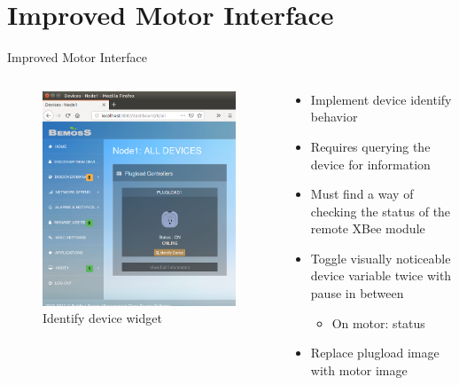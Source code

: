 \documentclass{beamer}
\begin{document}
\section{Improved Motor Interface}
\begin{frame}{Improved Motor Interface}{}
\begin{columns}[T]
\begin{column}{0.5\textwidth}
\begin{figure}
\includegraphics[scale=0.25]{../figs/deviceIdentifyPlugload.png}
\caption{Identify device widget}
\end{figure}
\end{column}
\begin{column}{0.5\textwidth}
	\begin{itemize}
		\item Implement device identify behavior  
		\item Requires querying the device for information
		\item Must find a way of checking the status of the remote XBee module
		\item Toggle visually noticeable device variable twice with pause in between
		\begin{itemize}
			\item On motor: status
		\end{itemize}
		\item Replace plugload image with motor image
	\end{itemize}
\end{column}
\end{columns}	
\end{frame}
\end{document}
